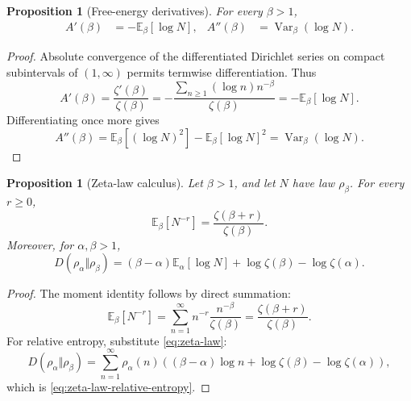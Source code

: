 \documentclass[11pt]{article}
\numberwithin{equation}{section}
\newtheorem{proposition}[theorem]{Proposition}
\theoremstyle{definition}
\theoremstyle{remark}
\DeclareMathOperator{\Var}{Var}
\newcommand{\E}{\mathbb E}
\newcommand{\1}{\mathbf 1}
\begin{document}
\begin{proposition}[Free-energy derivatives]
\label{prop:free-energy-derivatives}
For every \(\beta>1\),
\begin{align}
\label{eq:free-energy-derivatives}
A'(\beta)&=-\E_\beta[\log N],&
A''(\beta)&=\Var_\beta(\log N).
\end{align}
\end{proposition}

\begin{proof}
Absolute convergence of the differentiated Dirichlet series on compact subintervals of \((1,\infty)\) permits termwise differentiation.  Thus
\begin{equation}
\label{eq:first-free-derivative-proof}
A'(\beta)=\frac{\zeta'(\beta)}{\zeta(\beta)}
=-\frac{\sum_{n\ge1}(\log n)n^{-\beta}}{\zeta(\beta)}
=-\E_\beta[\log N].
\end{equation}
Differentiating once more gives
\begin{equation}
\label{eq:second-free-derivative-proof}
A''(\beta)=\E_\beta[(\log N)^2]-\E_\beta[\log N]^2
=\Var_\beta(\log N).
\end{equation}
\end{proof}

\begin{proposition}[Zeta-law calculus]
\label{prop:zeta-law-calculus}
Let \(\beta>1\), and let \(N\) have law \(\rho_\beta\).  For every \(r\ge0\),
\begin{equation}
\label{eq:zeta-law-moment}
\E_\beta[N^{-r}]=\frac{\zeta(\beta+r)}{\zeta(\beta)}.
\end{equation}
Moreover, for \(\alpha,\beta>1\),
\begin{equation}
\label{eq:zeta-law-relative-entropy}
D(\rho_\alpha\Vert\rho_\beta)
=(\beta-\alpha)\E_\alpha[\log N]
+\log\zeta(\beta)-\log\zeta(\alpha).
\end{equation}
\end{proposition}

\begin{proof}
The moment identity follows by direct summation:
\begin{equation}
\label{eq:zeta-law-moment-proof}
\E_\beta[N^{-r}]
=\sum_{n=1}^{\infty}n^{-r}\frac{n^{-\beta}}{\zeta(\beta)}
=\frac{\zeta(\beta+r)}{\zeta(\beta)}.
\end{equation}
For relative entropy, substitute \eqref{eq:zeta-law}:
\begin{equation}
\label{eq:zeta-law-relative-entropy-proof}
D(\rho_\alpha\Vert\rho_\beta)
=\sum_{n=1}^{\infty}\rho_\alpha(n)
\left((\beta-\alpha)\log n+\log\zeta(\beta)-\log\zeta(\alpha)\right),
\end{equation}
which is \eqref{eq:zeta-law-relative-entropy}.
\end{proof}
\end{document}
